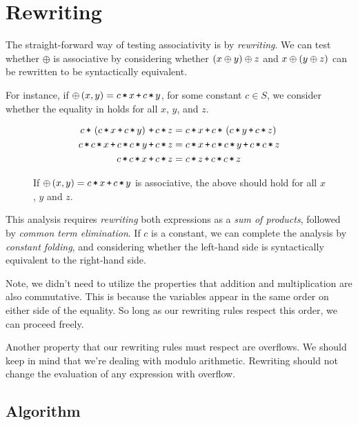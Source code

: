 
\section{Rewriting}\label{section:rewriting}

The straight-forward way of testing associativity is by \emph{rewriting}. We
can test whether $\oplus$ is associative by considering whether $\left({x \oplus y}\right)
\oplus z$ and $x \oplus \left({y \oplus z}\right)$ can be rewritten to be syntactically
equivalent.

For instance, if $\oplus\p{x,y} = c \lt x \lp c \lt y$, for some constant $c\in
S$, we consider whether the equality in  holds
for all $x$, $y$, and $z$.

\begin{figure*}[htbp!]
\begin{align*}
c \lt \p{c\lt x \lp c\lt y} \lp c \lt z &= c\lt x \lp c \lt \p{c\lt y \lp c\lt z} \\
c\lt c \lt x \lp c\lt c \lt y \lp c\lt z &= c\lt x \lp c\lt c \lt y \lp c\lt c \lt z \\
c\lt c \lt x \lp c\lt z &= c\lt z \lp c\lt c \lt z
\end{align*}
\caption[]{If $\oplus\p{x,y}=c\lt x \lp c\lt y$ is associative, the above
should hold for all $x$, $y$ and $z$.}
\label{figure:first-equality}
\end{figure*}

This analysis requires \emph{rewriting} both expressions as a \emph{sum of
products}, followed by \emph{common term elimination}. If $c$ is a constant, we
can complete the analysis by \emph{constant folding}, and considering whether
the left-hand side is syntactically equivalent to the right-hand side.

Note, we didn't need to utilize the properties that addition and multiplication
are also commutative.  This is because the variables appear in the same order
on either side of the equality. So long as our rewriting rules respect this
order, we can proceed freely. 

Another property that our rewriting rules must respect are overflows. We should
keep in mind that we're dealing with modulo arithmetic. Rewriting should not
change the evaluation of any expression with overflow.

\subsection{Algorithm}

